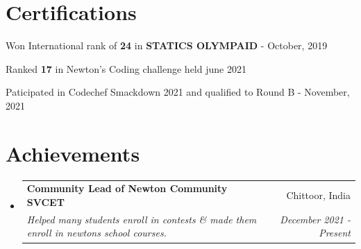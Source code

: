 \documentclass[a4paper,20pt]{article}
\makeatletter
\newcommand{\resumeSubheading}[4]{
  \vspace{-1pt}\item
    \begin{tabular*}{0.97\textwidth}{l@{\extracolsep{\fill}}r}
      \textbf{#1} & #2 \\
      \textit{#3} & \textit{#4} \\
    \end{tabular*}\vspace{-5pt}
}
\newcommand{\resumeSubHeadingListStart}{\begin{itemize}[leftmargin=*]}
\newcommand{\resumeSubHeadingListEnd}{\end{itemize}}
\makeatother
\begin{document}
\section{Certifications}
\begin{description}[font=$\bullet$]
\item {Won International rank of \textbf{24} in \textbf{STATICS OLYMPAID} - October, 2019}
\vspace{-5pt}
\item {Ranked \textbf{17} in Newton's Coding challenge held june 2021}
\vspace{-5pt}
\item {Paticipated in Codechef Smackdown 2021 and qualified to Round B - November, 2021}

\end{description}

\vspace{-5pt}
\section{Achievements}
  \resumeSubHeadingListStart
	\resumeSubheading
    {Community Lead of Newton Community SVCET}{Chittoor, India}
    {Helped many students enroll in contests \& made them enroll in newtons school courses.}{December 2021 - Present}
\vspace{5pt}

\resumeSubHeadingListEnd
\end{document}
